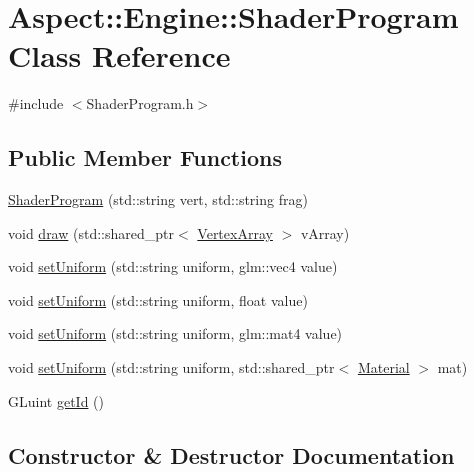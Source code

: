 \hypertarget{class_aspect_1_1_engine_1_1_shader_program}{}\section{Aspect\+:\+:Engine\+:\+:Shader\+Program Class Reference}
\label{class_aspect_1_1_engine_1_1_shader_program}


{\ttfamily \#include $<$Shader\+Program.\+h$>$}

\subsection*{Public Member Functions}
\begin{DoxyCompactItemize}
\item 
\mbox{\hyperlink{class_aspect_1_1_engine_1_1_shader_program_acfd947e0ce600660979f192b80fb41ea}{Shader\+Program}} (std\+::string vert, std\+::string frag)
\item 
void \mbox{\hyperlink{class_aspect_1_1_engine_1_1_shader_program_a4ecfbdda05fbfb1d5a36f6d584dd0ef2}{draw}} (std\+::shared\+\_\+ptr$<$ \mbox{\hyperlink{class_aspect_1_1_engine_1_1_vertex_array}{Vertex\+Array}} $>$ v\+Array)
\item 
void \mbox{\hyperlink{class_aspect_1_1_engine_1_1_shader_program_aefda3028d33a268999baca3a953d0ac8}{set\+Uniform}} (std\+::string uniform, glm\+::vec4 value)
\item 
void \mbox{\hyperlink{class_aspect_1_1_engine_1_1_shader_program_ac294314ed82949d84ad00deeffba56bd}{set\+Uniform}} (std\+::string uniform, float value)
\item 
void \mbox{\hyperlink{class_aspect_1_1_engine_1_1_shader_program_a9ed3540c0a42dd353b4c18b3df99d279}{set\+Uniform}} (std\+::string uniform, glm\+::mat4 value)
\item 
void \mbox{\hyperlink{class_aspect_1_1_engine_1_1_shader_program_abfaf605b8dfade33b086b2f33e07762b}{set\+Uniform}} (std\+::string uniform, std\+::shared\+\_\+ptr$<$ \mbox{\hyperlink{class_aspect_1_1_engine_1_1_material}{Material}} $>$ mat)
\item 
G\+Luint \mbox{\hyperlink{class_aspect_1_1_engine_1_1_shader_program_a78a54e4a39c3e605f7a5832e6ce7f692}{get\+Id}} ()
\end{DoxyCompactItemize}


\subsection{Constructor \& Destructor Documentation}
\mbox{\label{class_aspect_1_1_engine_1_1_shader_program_acfd947e0ce600660979f192b80fb41ea}} 
